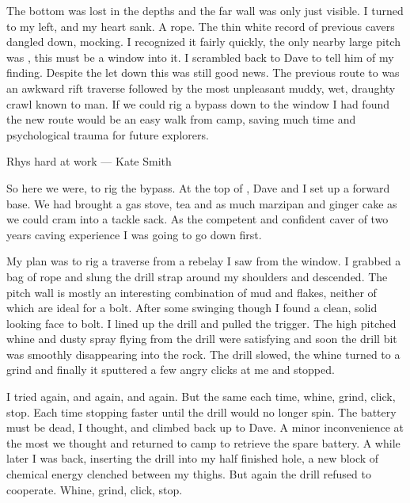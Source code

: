 The bottom was lost in the depths and the far wall was only just visible. I turned to my left, and my heart sank. A rope. The thin white record of previous cavers dangled down, mocking. I recognized it fairly quickly, the only nearby large pitch was , this must be a window into it. I scrambled back to Dave to tell him of my finding. Despite the let down this was still good news. The previous route to  was an awkward rift traverse followed by the most unpleasant muddy, wet, draughty crawl known to man. If we could rig a bypass down to the window I had found the new route would be an easy walk from camp, saving much time and psychological trauma for future explorers.

\begin{pagefigure}
\label{}
\caption{Rhys hard at work --- Kate Smith}
\end{pagefigure}

So here we were, to rig the bypass. At the top of , Dave and I set up a forward base. We had brought a gas stove, tea and as much marzipan and ginger cake as we could cram into a tackle sack. As the competent and confident caver of two years caving experience I was going to go down first. 

My plan was to rig a traverse from a rebelay I saw from the window. I grabbed a bag of rope and slung the drill strap around my shoulders and descended. The pitch wall is mostly an interesting combination of mud and flakes, neither of which are ideal for a bolt. After some swinging though I found a clean, solid looking face to bolt. I lined up the drill and pulled the trigger. The high pitched whine and dusty spray flying from the drill were satisfying and soon the drill bit was smoothly disappearing into the rock. The drill slowed, the whine turned to a grind and finally it sputtered a few angry clicks at me and stopped. 




I tried again, and again, and again. But the same each time, whine, grind, click, stop. Each time stopping faster until the drill would no longer spin. The battery must be dead, I thought, and climbed back up to Dave. A minor inconvenience at the most we thought and returned to camp to retrieve the spare battery. A while later I was back, inserting the drill into my half finished hole, a new block of chemical energy clenched between my thighs. But again the drill refused to cooperate. Whine, grind, click, stop. 

